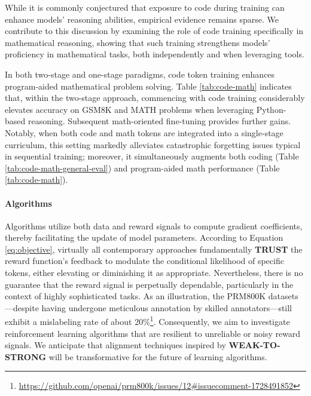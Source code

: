 While it is commonly conjectured that exposure to code during training can enhance models' reasoning abilities, empirical evidence remains sparse. We contribute to this discussion by examining the role of code training specifically in mathematical reasoning, showing that such training strengthens models' proficiency in mathematical tasks, both independently and when leveraging tools.

In both two-stage and one-stage paradigms, code token training enhances program-aided mathematical problem solving. Table \ref{tab:code-math} indicates that, within the two-stage approach, commencing with code training considerably elevates accuracy on GSM8K and MATH problems when leveraging Python-based reasoning. Subsequent math-oriented fine-tuning provides further gains. Notably, when both code and math tokens are integrated into a single-stage curriculum, this setting markedly alleviates catastrophic forgetting issues typical in sequential training; moreover, it simultaneously augments both coding (Table \ref{tab:code-math-general-eval}) and program-aided math performance (Table \ref{tab:code-math}).

\paragraph{Algorithms} Algorithms utilize both data and reward signals to compute gradient coefficients, thereby facilitating the update of model parameters. According to Equation \ref{eq:objective}, virtually all contemporary approaches fundamentally \textbf{TRUST} the reward function’s feedback to modulate the conditional likelihood of specific tokens, either elevating or diminishing it as appropriate. Nevertheless, there is no guarantee that the reward signal is perpetually dependable, particularly in the context of highly sophisticated tasks. As an illustration, the PRM800K datasets \citep{lightman2023let}—despite having undergone meticulous annotation by skilled annotators—still exhibit a mislabeling rate of about 20\%\footnote{\url{https://github.com/openai/prm800k/issues/12\#issuecomment-1728491852}}. Consequently, we aim to investigate reinforcement learning algorithms that are resilient to unreliable or noisy reward signals. We anticipate that alignment techniques inspired by \textbf{WEAK-TO-STRONG} \citep{burns2023weak} will be transformative for the future of learning algorithms.

